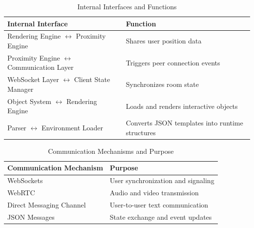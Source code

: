 \documentclass[12pt]{article}
\begin{document}
\begin{table}[h!]
\centering
\renewcommand{\arraystretch}{1.5}
\begin{tabular}{|p{6cm}|p{8cm}|}
\hline
\textbf{Internal Interface} & \textbf{Function} \\ 
\hline

Rendering Engine $\leftrightarrow$ Proximity Engine & Shares user position data \\ 
\hline

Proximity Engine $\leftrightarrow$ Communication Layer & Triggers peer connection events \\ 
\hline

WebSocket Layer $\leftrightarrow$ Client State Manager & Synchronizes room state \\ 
\hline

Object System $\leftrightarrow$ Rendering Engine & Loads and renders interactive objects \\ 
\hline

Parser $\leftrightarrow$ Environment Loader & Converts JSON templates into runtime structures \\ 
\hline

\end{tabular}
\caption{Internal Interfaces and Functions}

\end{table}

\begin{table}[h!]
\centering
\renewcommand{\arraystretch}{1.5}
\begin{tabular}{|p{6cm}|p{8cm}|}
\hline
\textbf{Communication Mechanism} & \textbf{Purpose} \\ 
\hline

WebSockets & User synchronization and signaling \\ 
\hline

WebRTC & Audio and video transmission \\ 
\hline

Direct Messaging Channel & User-to-user text communication \\ 
\hline

JSON Messages & State exchange and event updates \\ 
\hline

\end{tabular}
\caption{Communication Mechanisms and Purpose}

\end{table}
\end{document}
